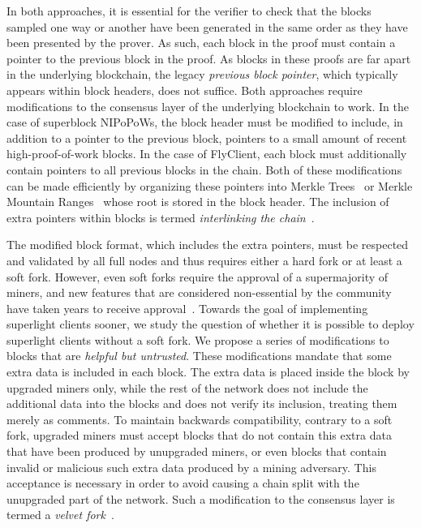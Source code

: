 In both approaches, it is essential for the verifier to check that the blocks
sampled one way or another have been generated in the same order as they have
been presented by the prover. As such, each block in the proof must contain a
pointer to the previous block in the proof. As blocks in these proofs are far
apart in the underlying blockchain, the legacy \emph{previous block pointer},
which typically appears within block headers, does not suffice.
Both approaches require modifications to the consensus layer of the underlying
blockchain to work. In the case of superblock NIPoPoWs, the block header must be
modified to include, in addition to a pointer to the previous block, pointers to
a small amount of recent high-proof-of-work blocks. In the case of FlyClient,
each block must additionally contain pointers to all previous blocks in the
chain. Both of these modifications can be made efficiently by organizing these
pointers into Merkle Trees~\cite{merkle} or Merkle Mountain Ranges~\cite{ct,mmr}
whose root is stored in the block header. The inclusion of extra pointers within
blocks is termed \emph{interlinking the chain}~\cite{popow}.

The modified block format, which includes the extra pointers, must be respected
and validated by all full nodes and thus requires either a hard fork or at least
a soft fork. However, even soft forks require the approval of a supermajority of
miners, and new features that are considered non-essential by the community have
taken years to receive approval~\cite{segwit}. Towards the goal of implementing
superlight clients sooner, we study the question of whether it is possible to
deploy superlight clients without a soft fork. We propose a series of
modifications to blocks that are \emph{helpful but untrusted}. These
modifications mandate that some extra data is included in each block. The extra
data is placed inside the block by upgraded miners only, while the rest of the
network does not include the additional data into the blocks and does not verify
its inclusion, treating them merely as comments. To maintain backwards
compatibility, contrary to a soft fork, upgraded miners must accept blocks that
do not contain this extra data that have been produced by unupgraded miners, or
even blocks that contain invalid or malicious such extra data produced by a
mining adversary. This acceptance is necessary in order to avoid causing a chain
split with the unupgraded part of the network. Such a modification to the
consensus layer is termed a \emph{velvet fork}~\cite{velvet}.

